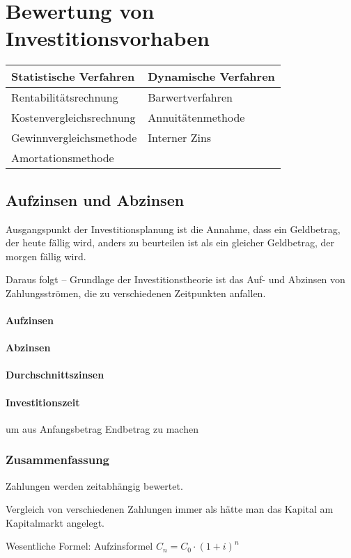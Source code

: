 \clearpage
\section{Bewertung von Investitionsvorhaben}
\begin{tabular}{l|l}
	{\bf Statistische Verfahren} & {\bf Dynamische Verfahren}\\\hline
	Rentabilitätsrechnung & Barwertverfahren\\
	Kostenvergleichsrechnung & Annuitätenmethode\\
	Gewinnvergleichsmethode & Interner Zins\\
	Amortationsmethode & \\
\end{tabular}

\clearpage
\subsection{Aufzinsen und Abzinsen}
Ausgangspunkt der Investitionsplanung ist die Annahme, dass ein Geldbetrag, der {\flqq heute\frqq} fällig wird, anders zu beurteilen ist als ein gleicher Geldbetrag, der {\flqq morgen\frqq} fällig wird.

Daraus folgt -- Grundlage der Investitionstheorie ist das Auf- und Abzinsen von Zahlungsströmen, die zu verschiedenen Zeitpunkten anfallen.

\paragraph{Aufzinsen}

\paragraph{Abzinsen}

\paragraph{Durchschnittszinsen}

\paragraph{Investitionszeit} um aus Anfangsbetrag Endbetrag zu machen

\clearpage
\subsubsection{Zusammenfassung}
\begin{compactitem}
	\item Zahlungen werden zeitabhängig bewertet.
	\item Vergleich von verschiedenen Zahlungen immer als hätte man das Kapital am Kapitalmarkt angelegt.
	\item Wesentliche Formel: Aufzinsformel $C_n=C_0\cdot(1+i)^n$
\end{compactitem}

